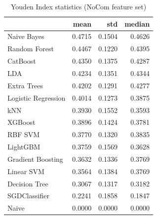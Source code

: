 \begin{table}
\caption{Youden Index statistics (NoCom feature set)}
\label{tab:youden_NoCom_stats}
\begin{tabular}{lrrr}
\toprule
 & mean & std & median \\
\midrule
Naive Bayes & 0.4715 & 0.1504 & 0.4626 \\
Random Forest & 0.4467 & 0.1220 & 0.4395 \\
CatBoost & 0.4350 & 0.1375 & 0.4287 \\
LDA & 0.4234 & 0.1351 & 0.4344 \\
Extra Trees & 0.4202 & 0.1291 & 0.4277 \\
Logistic Regression & 0.4014 & 0.1273 & 0.3875 \\
kNN & 0.3930 & 0.1552 & 0.3593 \\
XGBoost & 0.3896 & 0.1424 & 0.3781 \\
RBF SVM & 0.3770 & 0.1320 & 0.3835 \\
LightGBM & 0.3759 & 0.1569 & 0.3628 \\
Gradient Boosting & 0.3632 & 0.1336 & 0.3769 \\
Linear SVM & 0.3564 & 0.1384 & 0.3769 \\
Decision Tree & 0.3067 & 0.1317 & 0.3182 \\
SGDClassifier & 0.2241 & 0.1858 & 0.1847 \\
Naive & 0.0000 & 0.0000 & 0.0000 \\
\bottomrule
\end{tabular}
\end{table}
